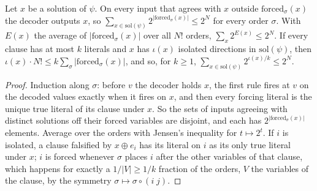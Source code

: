 \begin{lemma}
  \label{lem:lowerbounds-ppz-coding}
  \leanok
  Let $x$ be a solution of $\psi$. On every input that agrees with $x$ outside
  $\mathrm{forced}_\sigma(x)$ the decoder outputs $x$, so
  $\sum_{x\in\mathrm{sol}(\psi)} 2^{|\mathrm{forced}_\sigma(x)|}\le 2^N$ for every
  order $\sigma$. With $E(x)$ the average of $|\mathrm{forced}_\sigma(x)|$ over all
  $N!$ orders, $\sum_{x} 2^{E(x)}\le 2^N$. If every clause has at most $k$
  literals and $x$ has $\iota(x)$ isolated directions in $\mathrm{sol}(\psi)$, then
  $\iota(x)\cdot N!\le k\sum_\sigma|\mathrm{forced}_\sigma(x)|$, and so, for
  $k\ge1$, $\sum_{x\in\mathrm{sol}(\psi)} 2^{\iota(x)/k}\le 2^N$.
\end{lemma}
\begin{proof}
  \leanok
  Induction along $\sigma$: before $v$ the decoder holds $x$, the first rule
  fires at $v$ on the decoded values exactly when it fires on $x$, and then every
  forcing literal is the unique true literal of its clause under $x$. So the sets
  of inputs agreeing with distinct solutions off their forced variables are
  disjoint, and each has $2^{|\mathrm{forced}_\sigma(x)|}$ elements. Average over
  the orders with Jensen's inequality for $t\mapsto 2^t$. If $i$ is isolated, a
  clause falsified by $x\oplus e_i$ has its literal on $i$ as its only true
  literal under $x$; $i$ is forced whenever $\sigma$ places $i$ after the other
  variables of that clause, which happens for exactly a $1/|V|\ge1/k$ fraction of
  the orders, $V$ the variables of the clause, by the symmetry
  $\sigma\mapsto\sigma\circ(i\;j)$.
\end{proof}

